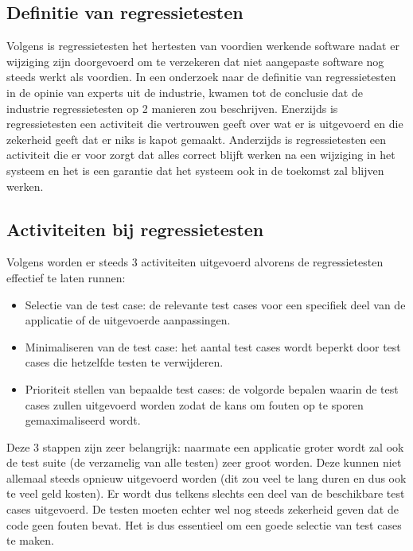 \subsection{Definitie van regressietesten}

Volgens \textcite{EngstroemRuneson2010} is regressietesten het hertesten van voordien werkende software nadat er wijziging zijn doorgevoerd om te verzekeren dat niet aangepaste software nog steeds werkt als voordien. In een onderzoek naar de definitie van regressietesten in de opinie van experts uit de industrie, kwamen \cite{Minhas2017} tot de conclusie dat de industrie regressietesten op 2 manieren zou beschrijven. Enerzijds is regressietesten een activiteit die vertrouwen geeft over wat er is uitgevoerd en die zekerheid geeft dat er niks is kapot gemaakt. Anderzijds is regressietesten een activiteit die er voor zorgt dat alles correct blijft werken na een wijziging in het systeem en het is een garantie dat het systeem ook in de toekomst zal blijven werken.

\subsection{Activiteiten bij regressietesten}

Volgens  \textcite{AhlamAnsari2016} worden er steeds 3 activiteiten uitgevoerd alvorens de regressietesten effectief te laten runnen:

\begin{itemize}
    \item Selectie van de test case: de relevante test cases voor een specifiek deel van de applicatie of de uitgevoerde aanpassingen.
    \item Minimaliseren van de test case: het aantal test cases wordt beperkt door test cases die hetzelfde testen te verwijderen. 
    \item Prioriteit stellen van bepaalde test cases: de volgorde bepalen waarin de test cases zullen uitgevoerd worden zodat de kans om fouten op te sporen gemaximaliseerd wordt.
\end{itemize}

Deze 3 stappen zijn zeer belangrijk: naarmate een applicatie groter wordt zal ook de test suite (de verzamelig van alle testen) zeer groot worden. Deze kunnen niet allemaal steeds opnieuw uitgevoerd worden (dit zou veel te lang duren en dus ook te veel geld kosten). Er wordt dus telkens slechts een deel van de beschikbare test cases uitgevoerd. De testen moeten echter wel nog steeds zekerheid geven dat de code geen fouten bevat. Het is dus essentieel om een goede selectie van test cases te maken. 

